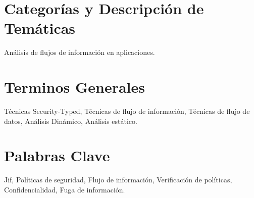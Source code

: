 \section*{Categorías y Descripción de Temáticas}
\label{sec:categorias}
Análisis de flujos de información en aplicaciones.


\section*{Terminos Generales}
Técnicas Security-Typed,
Técnicas de flujo de información,
Técnicas de flujo de datos,
Análisis Dinámico,
Análisis estático.




\section*{Palabras Clave}
Jif, 
Políticas de seguridad,
Flujo de información,
Verificación de políticas,
Confidencialidad,
Fuga de información.

